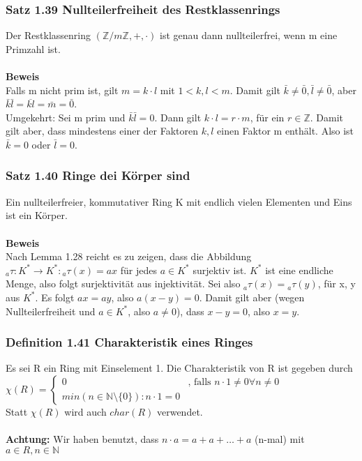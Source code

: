 \documentclass{report}
\newcommand{\N}{\mathbb{N}}
\newcommand{\Z}{\mathbb{Z}}
\theoremstyle{customrem}
\theoremstyle{customdef}
\begin{document}
\subsubsection{Satz 1.39 Nullteilerfreiheit des Restklassenrings}
Der Restklassenring $(\Z/m\Z, +, \cdot)$ ist genau dann nullteilerfrei, wenn m eine Primzahl ist.\\
\\
\textbf{Beweis}\\
Falls m nicht prim ist, gilt $m = k \cdot l$ mit $1 < k, l < m$. Damit gilt $\bar{k} \neq \bar{0}, \bar{l} \neq \bar{0}$, aber $\bar{k} \bar{l}= \overline{kl} = \bar{m} = \bar{0}$.\\Umgekehrt: Sei m prim und $\bar{k} \bar{l} = 0$. Dann gilt $k \cdot l= r \cdot m$, für ein $r \in \Z$. Damit gilt aber, dass mindestens einer der Faktoren $k, l$ einen Faktor m enthält. Also ist $\bar{k} = 0$ oder $\bar{l} = 0$.

\subsubsection{Satz 1.40 Ringe dei Körper sind}
Ein nullteilerfreier, kommutativer Ring K mit endlich vielen Elementen und Eins ist ein Körper.\\
\\
\textbf{Beweis}\\
Nach Lemma 1.28 reicht es zu zeigen, dass die Abbildung ${}_{a}\tau : K^* \to K^* : {}_{a}\tau(x) = ax$ für jedes $a \in K^*$ surjektiv ist. $K^*$ ist eine endliche Menge, also folgt surjektivität aus injektivität. Sei also ${}_a\tau(x) = {}_a\tau(y)$, für x, y aus $K^*$. Es folgt $ax = ay$, also $a (x - y) = 0$. Damit gilt aber  (wegen Nullteilerfreiheit und $a \in K^*$, also $a \neq 0$), dass $x - y = 0$, also $x = y$.

\subsubsection{Definition 1.41 Charakteristik eines Ringes}
Es sei R ein Ring mit Einselement 1. Die Charakteristik  von R ist gegeben durch\\
$\chi(R) = \begin{cases}
0 & \text{, falls } n \cdot 1 \neq 0 \forall n \neq 0\\
min(n \in \N \setminus \{0\}) : n \cdot 1 = 0
\end{cases}$\\
Statt $\chi(R)$ wird auch $char(R)$ verwendet.\\
\\
\textbf{Achtung:} Wir haben benutzt, dass $n \cdot a = a + a + \dots + a$ (n-mal) mit $a \in R, n \in \N$
\end{document}
